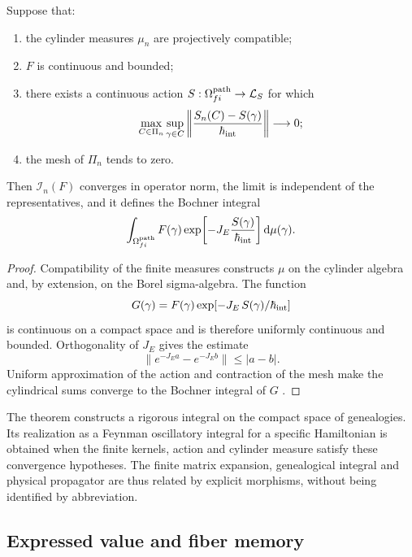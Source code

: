 \begin{theorem}
\label{thm:integral-genealogica-caminos-rev2}
Suppose that:
\begin{enumerate}
 \item the cylinder measures \(\mu_n\) are projectively compatible;
 \item \(F\) is continuous and bounded;
 \item there exists a continuous action
 \(S:\Omega^{\rm path}_{fi}\to\mathcal L_S\) for which
 \[
  \max_{C\in\Pi_n}\sup_{\gamma\in C}
  \left\|\frac{S_n(C)-S(\gamma)}{\hbar_{\rm int}}\right\|
  \longrightarrow0;
 \]
 \item the mesh of \(\Pi_n\) tends to zero.
\end{enumerate}
Then \(\mathcal I_n(F)\) converges in operator norm, the limit is
independent of the representatives, and it defines the Bochner integral
\begin{equation}
 \int_{\Omega^{\rm path}_{fi}}
 F(\gamma)
 \exp\!\left[-J_E\frac{S(\gamma)}{\hbar_{\rm int}}\right]
 \mathrm d\mu(\gamma).
 \label{eq:integral-genealogica-caminos-rev2}
\end{equation}
\end{theorem}

\begin{proof}
Compatibility of the finite measures constructs \(\mu\) on the cylinder
algebra and, by extension, on the Borel sigma-algebra. The function
\[
 G(\gamma)=F(\gamma)
 \exp[-J_E\,S(\gamma)/\hbar_{\rm int}]
\]
is continuous on a compact space and is therefore uniformly continuous and
bounded. Orthogonality of \(J_E\) gives the estimate
\[
 \|e^{-J_E a}-e^{-J_E b}\|\leq |a-b|.
\]
Uniform approximation of the action and contraction of the mesh make
the cylindrical sums converge to the Bochner integral of \(G\)
\cite{Bochner1955}.
\end{proof}

The theorem constructs a rigorous integral on the compact space of
genealogies. Its realization as a Feynman oscillatory integral for a
specific Hamiltonian is obtained when the finite kernels, action and
cylinder measure satisfy these convergence hypotheses. The finite
matrix expansion, genealogical integral and physical propagator are thus
related by explicit morphisms, without being identified by abbreviation.

\subsection{Expressed value and fiber memory}

